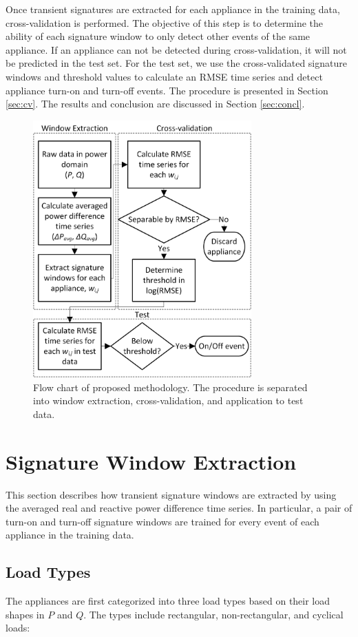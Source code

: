 \documentclass[conference]{IEEEtran}
\begin{document}
Once transient signatures are extracted for each appliance in the training data, cross-validation is performed.  The objective of this step is to determine the ability of each signature window to only detect other events of the same appliance. If an appliance can not be detected during cross-validation, it will not be predicted in the test set. For the test set, we use the cross-validated signature windows and threshold values to calculate an RMSE time series and detect appliance turn-on and turn-off events. The procedure is presented in Section \ref{sec:cv}. The results and conclusion are discussed in Section \ref{sec:concl}.  

\begin{figure}[!t]
	\centering
	\includegraphics[width=3.3in]{fig/flow.png}
	\caption{Flow chart of proposed methodology.  The procedure is separated into window extraction, cross-validation, and application to test data.}
	\label{fig:flow}
\end{figure}


\section{Signature Window Extraction}\label{sec:training}
This section describes how transient signature windows are extracted by using the averaged real and reactive power difference time series.  In particular, a pair of turn-on and turn-off signature windows are trained for every event of each appliance in the training data.  


\subsection{Load Types}
The appliances are first categorized into three load types based on their load shapes in $P$ and $Q$.  The types include rectangular, non-rectangular, and cyclical loads:
\end{document}
